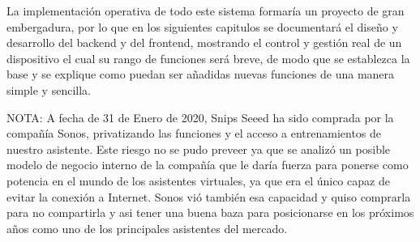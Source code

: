 La implementación operativa de todo este sistema formaría un proyecto de gran embergadura, por lo que en los siguientes capitulos se documentará el diseño y desarrollo del backend y del frontend, mostrando el control y gestión real de un dispositivo el cual su rango de funciones será breve, de modo que se establezca la base y se explique como puedan ser añadidas nuevas funciones de una manera simple y sencilla.

NOTA: A fecha de 31 de Enero de 2020, Snips Seeed ha sido comprada por la compañía Sonos, privatizando las funciones y el acceso a entrenamientos de nuestro asistente. Este riesgo no se pudo preveer ya que se analizó un posible modelo de negocio interno de la compañía que le daría fuerza para ponerse como potencia en el mundo de los asistentes virtuales, ya que era el único capaz de evitar la conexión a Internet. Sonos vió también esa capacidad y quiso comprarla para no compartirla y asi tener una buena baza para posicionarse en los próximos años como uno de los principales asistentes del mercado.
